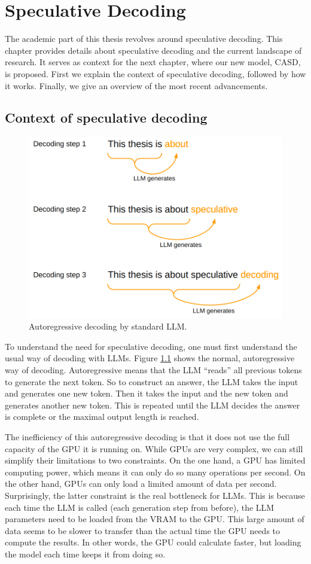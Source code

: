 
\chapter{Speculative Decoding}
\label{sec:speculative_decoding}

The academic part of this thesis revolves around speculative decoding. This chapter provides details about speculative decoding and the current landscape of research. It serves as context for the next chapter, where our new model, CASD, is proposed. First we explain the context of speculative decoding, followed by how it works. Finally, we give an overview of the most recent advancements. 

\section{Context of speculative decoding}

\begin{figure}[h]
	\centering
	\includegraphics[width=0.7\linewidth]{fig/spec_dec_autoregressive.png}
	\caption{Autoregressive decoding by standard LLM.}
	\label{fig:spec_dec_autoregressive}
\end{figure}

To understand the need for speculative decoding, one must first understand the usual way of decoding with LLMs. Figure \ref{fig:spec_dec_autoregressive} shows the normal, autoregressive way of decoding. Autoregressive means that the LLM ``reads'' all previous tokens to generate the next token. So to construct an answer, the LLM takes the input and generates one new token. Then it takes the input and the new token and generates another new token. This is repeated until the LLM decides the answer is complete or the maximal output length is reached.

The inefficiency of this autoregressive decoding is that it does not use the full capacity of the GPU it is running on. While GPUs are very complex, we can still simplify their limitations to two constraints. On the one hand, a GPU has limited computing power, which means it can only do so many operations per second. On the other hand, GPUs can only load a limited amount of data per second. Surprisingly, the latter constraint is the real bottleneck for LLMs. This is because each time the LLM is called (each generation step from before), the LLM parameters need to be loaded from the VRAM to the GPU. This large amount of data seems to be slower to transfer than the actual time the GPU needs to compute the results. In other words, the GPU could calculate faster, but loading the model each time keeps it from doing so.

